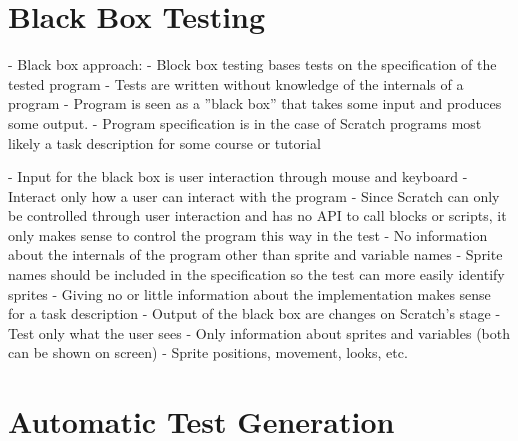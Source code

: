 \section{Black Box Testing}

- Black box approach:
    - Block box testing bases tests on the specification of the tested program
    - Tests are written without knowledge of the internals of a program
    - Program is seen as a ''black box'' that takes some input and produces some output.
    - Program specification is in the case of Scratch programs most likely a task description for some course or tutorial

    - Input for the black box is user interaction through mouse and keyboard
    - Interact only how a user can interact with the program
        - Since Scratch can only be controlled through user interaction and has no API to call blocks or scripts,
          it only makes sense to control the program this way in the test
        - No information about the internals of the program other than sprite and variable names
            - Sprite names should be included in the specification so the test can more easily identify sprites
            - Giving no or little information about the implementation makes sense for a task description
    - Output of the black box are changes on Scratch's stage
    - Test only what the user sees
        - Only information about sprites and variables (both can be shown on screen)
        - Sprite positions, movement, looks, etc.

\section{Automatic Test Generation}%
\label{sec:automatic_test_generation}



